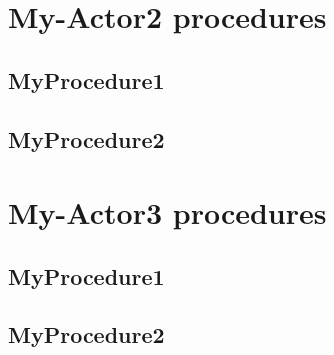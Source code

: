\section{My-Actor2 procedures}
\subsection{MyProcedure1}
\subsection{MyProcedure2}


\section{My-Actor3 procedures}

\subsection{MyProcedure1}
\subsection{MyProcedure2}